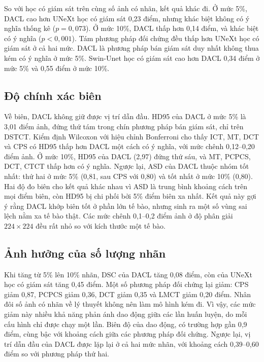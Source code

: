 So với học có giám sát trên cùng số ảnh có nhãn, kết quả khác đi. Ở mức 5\%, DACL cao hơn UNeXt học có giám sát 0,23 điểm, nhưng khác biệt không có ý nghĩa thống kê ($p=0{,}073$). Ở mức 10\%, DACL thấp hơn 0,14 điểm, và khác biệt có ý nghĩa ($p<0{,}001$). Tám phương pháp đối chứng đều thấp hơn UNeXt học có giám sát ở cả hai mức. DACL là phương pháp bán giám sát duy nhất không thua kém có ý nghĩa ở mức 5\%. Swin-Unet học có giám sát cao hơn DACL 0,34 điểm ở mức 5\% và 0,55 điểm ở mức 10\%.

\subsection{Độ chính xác biên}

Về biên, DACL không giữ được vị trí dẫn đầu. HD95 của DACL ở mức 5\% là 3,01 điểm ảnh, đứng thứ tám trong chín phương pháp bán giám sát, chỉ trên DSTCT. Kiểm định Wilcoxon với hiệu chỉnh Bonferroni cho thấy ICT, MT, DCT và CPS có HD95 thấp hơn DACL một cách có ý nghĩa, với mức chênh 0,12--0,20 điểm ảnh. Ở mức 10\%, HD95 của DACL (2,97) đứng thứ sáu, và MT, PCPCS, DCT, CTCT thấp hơn có ý nghĩa. Ngược lại, ASD của DACL thuộc nhóm tốt nhất: thứ hai ở mức 5\% (0,81, sau CPS với 0,80) và tốt nhất ở mức 10\% (0,80). Hai độ đo biên cho kết quả khác nhau vì ASD là trung bình khoảng cách trên mọi điểm biên, còn HD95 bị chi phối bởi 5\% điểm biên xa nhất. Kết quả này gợi ý rằng DACL khớp biên tốt ở phần lớn tế bào, nhưng sinh ra một số vùng sai lệch nằm xa tế bào thật. Các mức chênh 0,1--0,2 điểm ảnh ở độ phân giải $224\times224$ đều rất nhỏ so với kích thước một tế bào.

\subsection{Ảnh hưởng của số lượng nhãn}

Khi tăng từ 5\% lên 10\% nhãn, DSC của DACL tăng 0,08 điểm, còn của UNeXt học có giám sát tăng 0,45 điểm. Một số phương pháp đối chứng lại giảm: CPS giảm 0,87, PCPCS giảm 0,36, DCT giảm 0,35 và LMCT giảm 0,20 điểm. Nhân đôi số ảnh có nhãn về lý thuyết không nên làm mô hình kém đi. Vì vậy, các mức giảm này nhiều khả năng phản ánh dao động giữa các lần huấn luyện, do mỗi cấu hình chỉ được chạy một lần. Biên độ của dao động, có trường hợp gần 0,9 điểm, cùng bậc với khoảng cách giữa các phương pháp đối chứng. Ngược lại, vị trí dẫn đầu của DACL được lặp lại ở cả hai mức nhãn, với khoảng cách 0,39--0,60 điểm so với phương pháp thứ hai.

